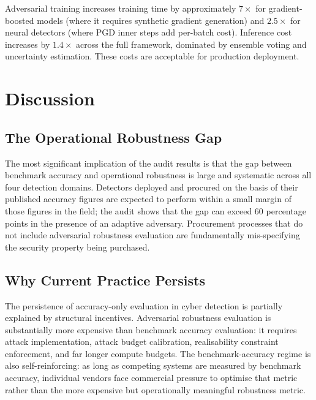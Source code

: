 \documentclass[sigconf,nonacm]{acmart}
\begin{document}
Adversarial training increases training time by approximately $7\times$ for
gradient-boosted models (where it requires synthetic gradient generation) and
$2.5\times$ for neural detectors (where PGD inner steps add per-batch cost).
Inference cost increases by $1.4\times$ across the full framework, dominated
by ensemble voting and uncertainty estimation. These costs are
acceptable for production deployment.

\section{Discussion}
\label{sec:discussion}

\subsection{The Operational Robustness Gap}

The most significant implication of the audit results is that the gap between
benchmark accuracy and operational robustness is large and systematic across
all four detection domains. Detectors deployed and procured on the basis of
their published accuracy figures are expected to perform within a small
margin of those figures in the field; the audit shows that the gap can exceed
60 percentage points in the presence of an adaptive adversary. Procurement
processes that do not include adversarial robustness evaluation are
fundamentally mis-specifying the security property being purchased.

\subsection{Why Current Practice Persists}

The persistence of accuracy-only evaluation in cyber detection is partially
explained by structural incentives. Adversarial robustness evaluation is
substantially more expensive than benchmark accuracy evaluation: it requires
attack implementation, attack budget calibration, realisability constraint
enforcement, and far longer compute budgets. The benchmark-accuracy regime is
also self-reinforcing: as long as competing systems are measured by
benchmark accuracy, individual vendors face commercial pressure to optimise
that metric rather than the more expensive but operationally meaningful
robustness metric.
\end{document}
